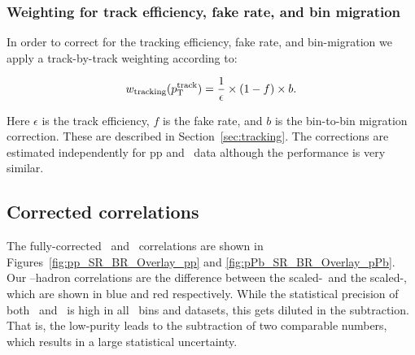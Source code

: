 



\subsubsection{Weighting for track efficiency, fake rate, and bin migration}
In order to correct for the tracking efficiency, fake rate, and bin-migration we apply a track-by-track weighting according to:

\begin{equation}
w_{\mathrm{tracking}}(p_{\mathrm{T}}^{\mathrm{track}}) = \frac{1}{\epsilon}\times(1- f)\times b.
\end{equation}

Here $\epsilon$ is the track efficiency, $f$ is the fake rate, and $b$ is the bin-to-bin migration correction. These are described in Section~\ref{sec:tracking}. The corrections are estimated independently for pp and \pPb~data although the performance is very similar.  

\subsection{Corrected correlations}
The fully-corrected \CSR~and \CBR~correlations are shown in Figures~\ref{fig:pp_SR_BR_Overlay_pp} and \ref{fig:pPb_SR_BR_Overlay_pPb}. Our \gammaiso--hadron correlations are the difference between the scaled-\CSR~and the scaled-\CBR, which are shown in blue and red respectively. While the statistical precision of both \CSR~and \CBR~is high in all \zt~bins and datasets, this gets diluted in the subtraction. That is, the low-purity leads to the subtraction of two comparable numbers, which results in a large statistical uncertainty.

